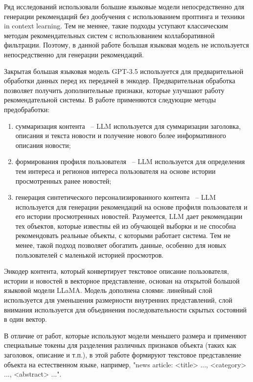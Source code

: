 Ряд исследований использовали большие языковые модели непосредственно для генерации рекомендаций без дообучения с использованием проптинга и техники in context learning. Тем не меннее, такие подходы уступают классическим методам рекомендательных систем с использованием коллаборативной фильтрации. Поэтому, в данной работе большая языковая модель не используется непосредственно для генерации рекомендаций.

Закрытая большая языковая модель GPT-3.5 используется для предварительной обработки данных перед их передачей в энкодер. Предварительная обработка позволяет получить дополнительные признаки, которые улучшают работу рекомендательной системы. В работе применяются следующие методы предобработки:
\begin{enumerate}
    \item суммаризация контента ~-- LLM используется для суммаризации заголовка, описания и текста новости и получение нового более информативного описания новости;
    \item формирования профиля пользователя ~-- LLM используется для определения тем интереса и регионов интереса пользователя на основе истории просмотренных ранее новостей;
    \item генерация синтетического персонализированного контента ~-- LLM используется для генерации рекомендаций на основе профиля пользователя и его истории просмотренных новостей. Разумеется, LLM дает рекомендации тех объектов, которые известны ей из обучающей выборки и не способна рекомендовать реальные объекты, с которыми работает система. Тем не менее, такой подход позволяет обогатить данные, особенно для новых пользователей с маленькой историей просмотров.
\end{enumerate}

Энкодер контента, который конвертирует текстовое описание пользователя, истории и новостей в векторное представление, основан на открытой большой языковой модели LLaMA. Модель дополнена слоями: линейный слой используется для уменьшения размерности внутренних представлений, слой внимания используется для объединения последовательности скрытых состояний в один вектор.

В отличие от работ, которые используют модели меньшего размера и применяют специальные токены для разделения различных признаков объекта (таких как заголовок, описание и т.п.), в этой работе формируют текстовое представление объекта на естественном языке, например, "news article: <title> ..., <category> ..., <abstract> ...".

